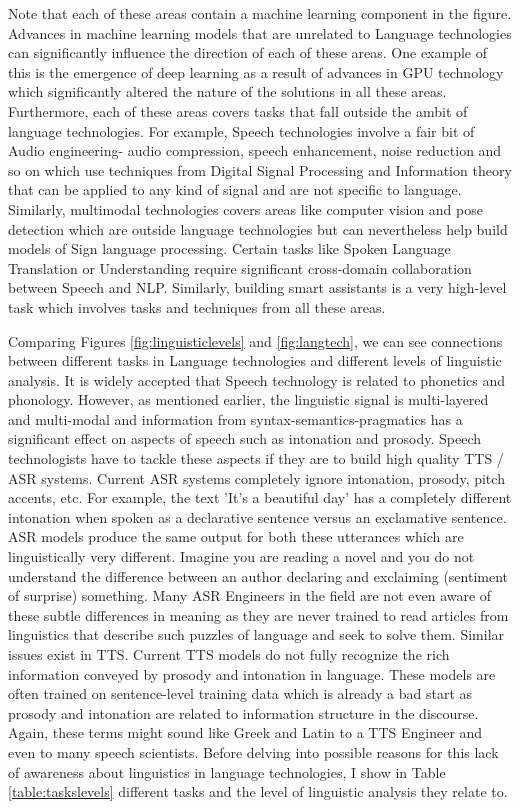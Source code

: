 \documentclass{article}
\begin{document}
Note that each of these areas contain a machine learning component in the figure. Advances in machine learning models that are unrelated to Language technologies can significantly influence the direction of each of these areas. One example of this is the emergence of deep learning as a result of advances in GPU technology which significantly altered the nature of the solutions in all these areas. Furthermore, each of these areas covers tasks that fall outside the ambit of language technologies. For example, Speech technologies involve a fair bit of Audio engineering- audio compression, speech enhancement, noise reduction and so on which use techniques from Digital Signal Processing and Information theory that can be applied to any kind of signal and are not specific to language. Similarly, multimodal technologies covers areas like computer vision and pose detection which are outside language technologies but can nevertheless help build models of Sign language processing. Certain tasks like Spoken Language Translation or Understanding require significant cross-domain collaboration between Speech and NLP. Similarly, building smart assistants is a very high-level task which involves tasks and techniques from all these areas.

Comparing Figures \ref{fig:linguisticlevels} and \ref{fig:langtech}, we can see connections between different tasks in Language technologies and different levels of linguistic analysis. It is widely accepted that Speech technology is related to phonetics and phonology. However, as mentioned earlier, the linguistic signal is multi-layered and multi-modal and information from syntax-semantics-pragmatics has a significant effect on aspects of speech such as intonation and prosody. Speech technologists have to tackle these aspects if they are to build high quality TTS / ASR systems. Current ASR systems completely ignore intonation, prosody, pitch accents, etc. For example, the text 'It's a beautiful day' has a completely different intonation when spoken as a declarative sentence versus an exclamative sentence. ASR models produce the same output for both these utterances which are linguistically very different. Imagine you are reading a novel and you do not understand the difference between an author declaring and exclaiming (sentiment of surprise) something. Many ASR Engineers in the field are not even aware of these subtle differences in meaning as they are never trained to read articles from linguistics that describe such puzzles of language and seek to solve them. Similar issues exist in TTS. Current TTS models do not fully recognize the rich information conveyed by prosody and intonation in language. These models are often trained on sentence-level training data which is already a bad start as prosody and intonation are related to information structure in the discourse. Again, these terms might sound like Greek and Latin to a TTS Engineer and even to many speech scientists. Before delving into possible reasons for this lack of awareness about linguistics in language technologies, I show in Table \ref{table:taskslevels} different tasks and the level of linguistic analysis they relate to. 
\end{document}
